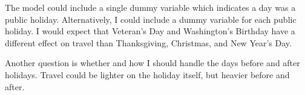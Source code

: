 \documentclass[]{book}
\newenvironment{Shaded}{\begin{snugshade}}{\end{snugshade}}
\newcommand{\DataTypeTok}[1]{\textcolor[rgb]{0.13,0.29,0.53}{#1}}
\newcommand{\DecValTok}[1]{\textcolor[rgb]{0.00,0.00,0.81}{#1}}
\newcommand{\FloatTok}[1]{\textcolor[rgb]{0.00,0.00,0.81}{#1}}
\newcommand{\KeywordTok}[1]{\textcolor[rgb]{0.13,0.29,0.53}{\textbf{#1}}}
\newcommand{\NormalTok}[1]{#1}
\newcommand{\OperatorTok}[1]{\textcolor[rgb]{0.81,0.36,0.00}{\textbf{#1}}}
\newcommand{\OtherTok}[1]{\textcolor[rgb]{0.56,0.35,0.01}{#1}}
\newcommand{\StringTok}[1]{\textcolor[rgb]{0.31,0.60,0.02}{#1}}
\theoremstyle{plain}
\theoremstyle{remark}
\begin{document}
The model could include a single dummy variable which indicates a day
was a public holiday. Alternatively, I could include a dummy variable
for each public holiday. I would expect that Veteran's Day and
Washington's Birthday have a different effect on travel than
Thanksgiving, Christmas, and New Year's Day.

Another question is whether and how I should handle the days before and
after holidays. Travel could be lighter on the holiday itself, but
heavier before and after.

\begin{Shaded}
\end{Shaded}
\end{document}
